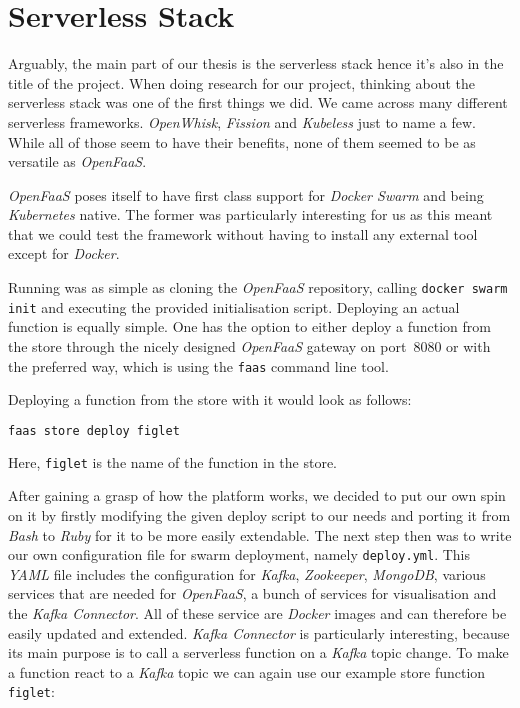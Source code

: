 \section{Serverless Stack}

Arguably, the main part of our thesis is the serverless stack hence it's also in the title of the
project. When doing research for our project, thinking about the serverless stack was one of the
first things we did. We came across many different serverless frameworks. \textit{OpenWhisk},
\textit{Fission} and \textit{Kubeless} just to name a few. While all of those seem to have their
benefits, none of them seemed to be as versatile as \textit{OpenFaaS}.

\textit{OpenFaaS} poses itself to have first class support for \textit{Docker Swarm} and being
\textit{Kubernetes} native. The former was particularly interesting for us as this meant that we
could test the framework without having to install any external tool except for  \textit{Docker}.

Running was as simple as cloning the \textit{OpenFaaS} repository, calling \texttt{docker swarm
init} and executing the provided initialisation script. Deploying an actual function is equally
simple. One has the option to either deploy a function from the store through the nicely designed
\textit{OpenFaaS} gateway on port~8080 or with the preferred way, which is using the
\texttt{faas} command line tool.

Deploying a function from the store with it would look as follows:

\begin{lstlisting}[language=bash]
faas store deploy figlet
\end{lstlisting}

Here, \texttt{figlet} is the name of the function in the store.

After gaining a grasp of how the platform works, we decided to put our own spin on it by firstly
modifying the given deploy script to our needs and porting it from \textit{Bash} to \textit{Ruby}
for it to be more easily extendable. The next step then was to write our own configuration file for swarm
deployment, namely \texttt{deploy.yml}. This \textit{YAML} file includes the configuration for
\textit{Kafka}, \textit{Zookeeper}, \textit{MongoDB}, various services that are needed for
\textit{OpenFaaS}, a bunch of services for visualisation and the \textit{Kafka Connector}. All of
these service are \textit{Docker} images and can therefore be easily updated and extended.
\textit{Kafka Connector} is particularly interesting, because its main purpose is to call a
serverless function on a \textit{Kafka} topic change. To make a function react to a \textit{Kafka} topic we can again
use our example store function \texttt{figlet}:

